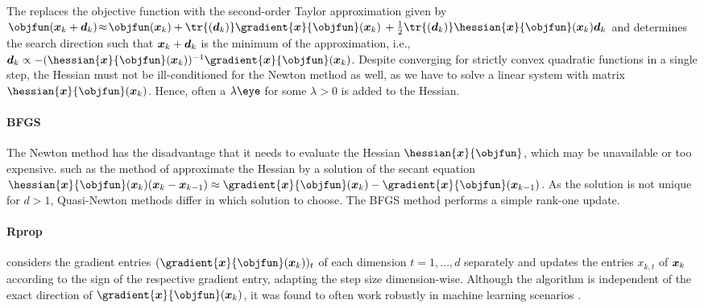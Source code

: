 The 
replaces the objective function with the second-order Taylor approximation
given by
$\objfun(\*x_k + \*d_k)
\!\approx\! \objfun(\*x_k) +
\tr{(\*d_k)} \gradient{\*x}{\objfun}(\*x_k) \,+
\frac{1}{2} \tr{(\*d_k)} \hessian{\*x}{\objfun}(\*x_k) \*d_k$
and determines the search direction such that ${\boldsymbol{x}}_k + {\boldsymbol{d}}_k$ is
the minimum of the approximation, i.e.,
$\*d_k \propto
-(\hessian{\*x}{\objfun}(\*x_k))^{-1} \gradient{\*x}{\objfun}(\*x_k)$.
Despite converging for strictly convex quadratic functions in a single step,
the Hessian must not be ill-conditioned for the Newton method as well,
as we have to solve a linear system with matrix
$\hessian{\*x}{\objfun}(\*x_k)$.
Hence, often a  $\lambda \eye$
for some $\lambda > 0$ is added to the Hessian.

\paragraph{BFGS}

The Newton method has the disadvantage that it needs to evaluate the
Hessian $\hessian{\*x}{\objfun}$,
which may be unavailable or too expensive.
 such as the method of
approximate the Hessian by a solution of the secant equation
$\hessian{\*x}{\objfun}(\*x_k) (\*x_k - \*x_{k-1}) \approx
\gradient{\*x}{\objfun}(\*x_k) - \gradient{\*x}{\objfun}(\*x_{k-1})$.
As the solution is not unique for $d > 1$,
Quasi-Newton methods differ in which solution to choose.
The BFGS method performs a simple rank-one update.

\paragraph{Rprop}

considers the gradient entries $(\gradient{\*x}{\objfun}(\*x_k))_t$
of each dimension $t = 1, \dotsc, d$ separately
and updates the entries $x_{k,t}$ of ${\boldsymbol{x}}_k$
according to the sign of the respective gradient entry,
adapting the step size dimension-wise.
Although the algorithm is independent of the exact direction
of $\gradient{\*x}{\objfun}(\*x_k)$,
it was found to often work robustly in machine learning scenarios
\cite{Toussaint15Introduction}.


